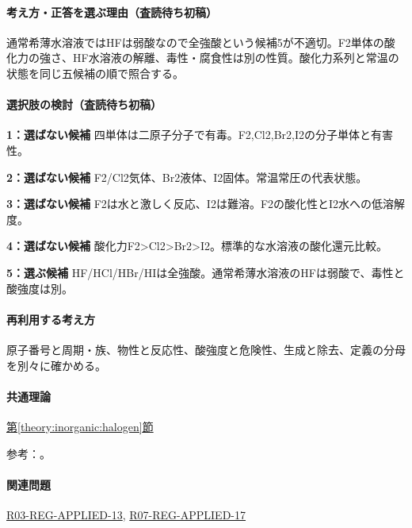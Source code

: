 \paragraph{考え方・正答を選ぶ理由（査読待ち初稿）} 通常希薄水溶液ではHFは弱酸なので全強酸という候補5が不適切。F2単体の酸化力の強さ、HF水溶液の解離、毒性・腐食性は別の性質。酸化力系列と常温の状態を同じ五候補の順で照合する。

\paragraph{選択肢の検討（査読待ち初稿）}\mbox{}\par

\noindent\textbf{1：選ばない候補} 四単体は二原子分子で有毒。F2,Cl2,Br2,I2の分子単体と有害性。\par

\noindent\textbf{2：選ばない候補} F2/Cl2気体、Br2液体、I2固体。常温常圧の代表状態。\par

\noindent\textbf{3：選ばない候補} F2は水と激しく反応、I2は難溶。F2の酸化性とI2水への低溶解度。\par

\noindent\textbf{4：選ばない候補} 酸化力F2>Cl2>Br2>I2。標準的な水溶液の酸化還元比較。\par

\noindent\textbf{5：選ぶ候補} HF/HCl/HBr/HIは全強酸。通常希薄水溶液のHFは弱酸で、毒性と酸強度は別。\par

\paragraph{再利用する考え方} 原子番号と周期・族、物性と反応性、酸強度と危険性、生成と除去、定義の分母を別々に確かめる。

\paragraph{共通理論} \hyperref[theory:inorganic:halogen]{第\ref*{theory:inorganic:halogen}節}

\par 参考：\cite{inorganic_halogen_ref,niosh_hf}。

\paragraph{関連問題} \hyperref[q:r03-reg-applied-13]{R03-REG-APPLIED-13}, \hyperref[q:r07-reg-applied-17]{R07-REG-APPLIED-17}

